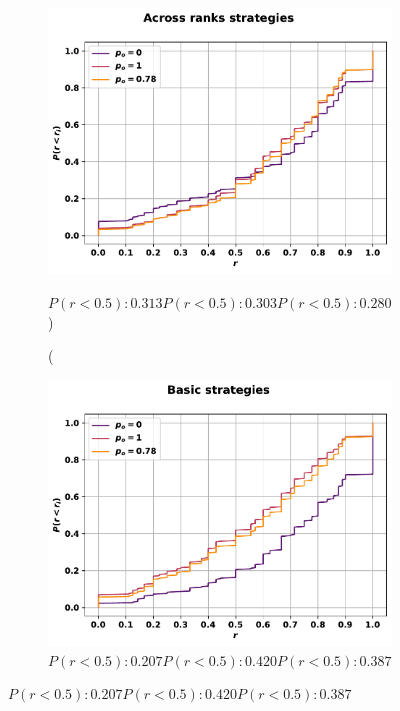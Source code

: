 \begin{figure}[!htbp]
\begin{subfigure}{.45\textwidth}
    \includegraphics[width=\textwidth]{src/chapters/07/img/cfd_to_sequence_across_ranks_strategies.pdf}
    \caption(\(P(r<0.5): 0.313 P(r<0.5): 0.303 P(r<0.5): 0.280\))
    \end{subfigure}\hfill
    \begin{subfigure}{.45\textwidth}
    \includegraphics[width=\textwidth]{src/chapters/07/img/cfd_to_sequence_basic_strategies.pdf}
    \caption{\(P(r<0.5): 0.207 P(r<0.5): 0.420 P(r<0.5): 0.387\)}
    \end{subfigure}
\end{figure}



